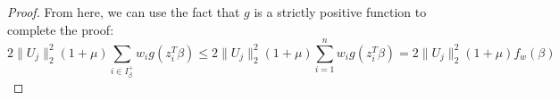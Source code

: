 \begin{proof}
    From here, we can use the fact that $g$ is a strictly positive function
    to complete the proof:
    \begin{equation*}
        2 \lVert U_j \rVert_2^2 (1 + \mu) \sum_{i \in I_\beta^+} w_i g(z_i^T \beta)
        \leq 2 \lVert U_j \rVert_2^2 (1 + \mu) \sum_{i = 1}^n w_i g(z_i^T \beta)
        = 2 \lVert U_j \rVert_2^2 (1 + \mu) f_w(\beta)
    \end{equation*}
\end{proof}